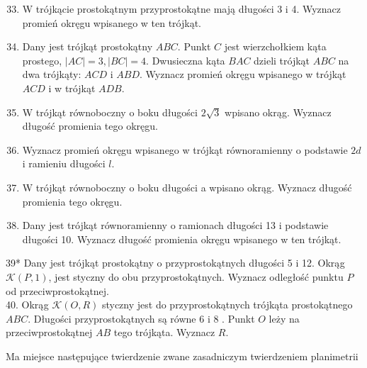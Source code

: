 \documentclass[10pt]{article}
\begin{document}
\begin{enumerate}
  \setcounter{enumi}{32}
  \item W trójkącie prostokątnym przyprostokątne mają długości 3 i 4. Wyznacz promień okręgu wpisanego w ten trójkąt.
  \item Dany jest trójkąt prostokątny \(A B C\). Punkt \(C\) jest wierzchołkiem kąta prostego, \(|A C|=3,|B C|=4\). Dwusieczna kąta \(B A C\) dzieli trójkąt \(A B C\) na dwa trójkąty: \(A C D\) i \(A B D\). Wyznacz promień okręgu wpisanego w trójkąt \(A C D\) i w trójkąt \(A D B\).
  \item W trójkąt równoboczny o boku długości \(2 \sqrt{3}\) wpisano okrąg. Wyznacz długość promienia tego okręgu.
  \item Wyznacz promień okręgu wpisanego w trójkąt równoramienny o podstawie \(2 d\) i ramieniu długości \(l\).
  \item W trójkąt równoboczny o boku długości a wpisano okrąg. Wyznacz długość promienia tego okręgu.
  \item Dany jest trójkąt równoramienny o ramionach długości 13 i podstawie długości 10. Wyznacz długość promienia okręgu wpisanego w ten trójkąt.
\end{enumerate}

39* Dany jest trójkąt prostokątny o przyprostokątnych długości 5 i 12. Okrąg \(\mathcal{K}(P, 1)\), jest styczny do obu przyprostokątnych. Wyznacz odległość punktu \(P\) od przeciwprostokątnej.\\
40. Okrąg \(\mathcal{K}(O, R)\) styczny jest do przyprostokątnych trójkąta prostokątnego \(A B C\). Długości przyprostokątnych są równe 6 i 8 . Punkt \(O\) leży na przeciwprostokątnej \(A B\) tego trójkąta. Wyznacz \(R\).

Ma miejsce następujące twierdzenie zwane zasadniczym twierdzeniem planimetrii
\end{document}
